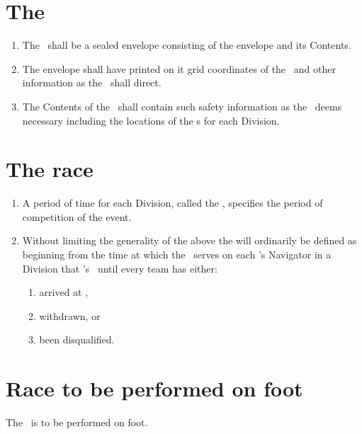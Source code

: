 \documentclass[12pt]{report}
\begin{document}
  \section{The \TeamEnvelope}
  \begin{enumerate}
    \item The \TeamEnvelope\ shall be a sealed envelope consisting of the envelope and its Contents.
    \item The envelope shall have printed on it grid coordinates of the \Endpoint\ and other information as the \RaceDirector\ shall direct.
    \item The Contents of the \TeamEnvelope\ shall contain such safety information as the \RaceDirector\ deems necessary including the locations of the \dropoffpoint s for each Division.
  \end{enumerate}
  \section{The race}
  \begin{enumerate}
    \item A period of time for each Division, called the \race, specifies the period of competition of the event.
    \item Without limiting the generality of the above the  will ordinarily be defined as beginning from the time at which the \LeadDriver\ serves on each \team's Navigator in a Division that \team's \TeamEnvelope\ until every team has either:
        \begin{enumerate}
          \item arrived at \Endpoint,
          \item  withdrawn, or
          \item been disqualified.
        \end{enumerate}
  \end{enumerate}
  \section{Race to be performed on foot}
  \begin{fenumerate}
  \item The \race\ is to be performed on foot.
  \end{fenumerate}
\end{document}
